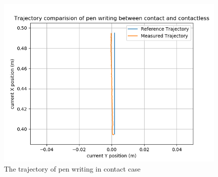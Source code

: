 \documentclass[report.tex]{subfiles}
\begin{document}
    \begin{figure}[H]
        \captionsetup[figure]{justification=centering}
                \centering
                \includegraphics[width=0.8\linewidth]{images/us2_contact_traj.png}
                \caption{The trajectory of pen writing in contact case}
                \label{fig:us2_con_plot}
    \end{figure}
\end{document}
